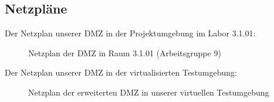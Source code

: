 

\clearpage




\clearpage

\subsection{Netzpläne}
\label{app:Netzplan}
Der Netzplan unserer DMZ in der Projektumgebung im Labor 3.1.01:
\begin{figure}[htb]
\centering
{}
\caption{Netzplan der DMZ in Raum 3.1.01 (Arbeitsgruppe 9)}
\end{figure}

Der Netzplan unserer DMZ in der virtualisierten Testumgebung:
\begin{figure}[htb]
    \centering
    \caption{Netzplan der erweiterten DMZ in unserer virtuellen Testumgebung}
\end{figure}
\clearpage

